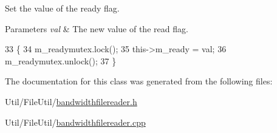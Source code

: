 Set the value of the ready flag. 


\begin{DoxyParams}{Parameters}
{\em val} & The new value of the read flag. \\
\hline
\end{DoxyParams}

\begin{DoxyCode}
33 \{
34     m\_readymutex.lock();
35     this->m\_ready = val;
36     m\_readymutex.unlock();
37 \}
\end{DoxyCode}


The documentation for this class was generated from the following files\-:\begin{DoxyCompactItemize}
\item 
Util/\-File\-Util/\hyperlink{bandwidthfilereader_8h}{bandwidthfilereader.\-h}\item 
Util/\-File\-Util/\hyperlink{bandwidthfilereader_8cpp}{bandwidthfilereader.\-cpp}\end{DoxyCompactItemize}
